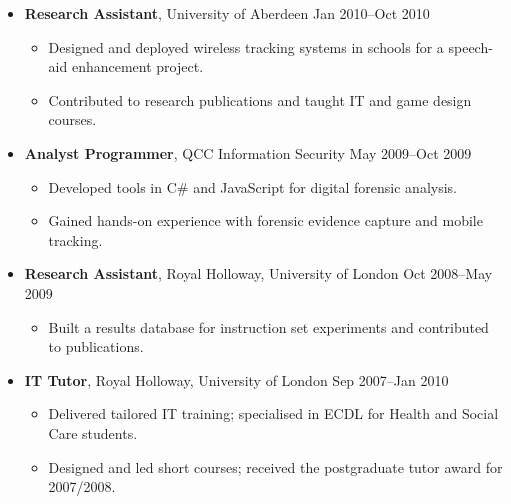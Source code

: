\begin{itemize}
  \item \textbf{Research Assistant}, University of Aberdeen \hfill Jan 2010--Oct 2010
  \begin{itemize}
    \item Designed and deployed wireless tracking systems in schools for a speech-aid enhancement project.
    \item Contributed to research publications and taught IT and game design courses.
  \end{itemize}

  \item \textbf{Analyst Programmer}, QCC Information Security \hfill May 2009--Oct 2009
  \begin{itemize}
    \item Developed tools in C# and JavaScript for digital forensic analysis.
    \item Gained hands-on experience with forensic evidence capture and mobile tracking.
  \end{itemize}

  \item \textbf{Research Assistant}, Royal Holloway, University of London \hfill Oct 2008--May 2009
  \begin{itemize}
    \item Built a results database for instruction set experiments and contributed to publications.
  \end{itemize}

  \item \textbf{IT Tutor}, Royal Holloway, University of London \hfill Sep 2007--Jan 2010
  \begin{itemize}
    \item Delivered tailored IT training; specialised in ECDL for Health and Social Care students.
    \item Designed and led short courses; received the postgraduate tutor award for 2007/2008.
  \end{itemize}
\end{itemize}

